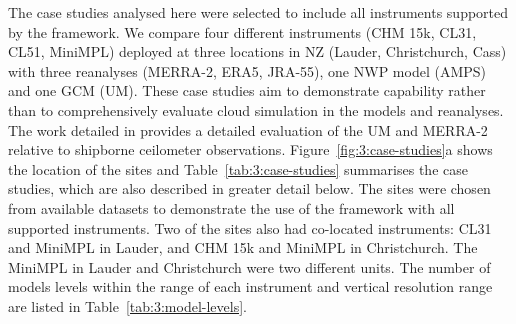 \begin{table}
\caption[Number of models levels and vertical resolution]{
Number of models levels and vertical resolution in the range of the
instrument at the locations of the case studies. First number is the number
of levels, followed by the minimum and maximum distance range between adjacent
model levels in the lidar's range (m).
}
\label{tab:3:model-levels}
\centerline{}
\end{table}

The case studies analysed here were selected
to include all instruments supported by the framework. We compare four different
instruments (CHM 15k, CL31, CL51, MiniMPL) deployed at three locations in NZ
(Lauder, Christchurch, Cass) with three reanalyses (MERRA-2, ERA5, JRA-55),
one NWP model (AMPS) and one GCM (UM).
These case studies aim to demonstrate capability rather than to comprehensively evaluate cloud simulation in the
models and reanalyses. The work detailed in \cite{kuma2020a} provides a detailed evaluation of the UM and MERRA-2 relative to shipborne ceilometer observations.
Figure~\ref{fig:3:case-studies}a shows the location of the sites and Table~\ref{tab:3:case-studies}
summarises the case studies, which are also described in greater detail below.
The sites were chosen from available datasets to demonstrate the use of the
framework with all supported instruments. Two of the sites also had co-located
instruments: CL31 and MiniMPL in Lauder, and CHM 15k and MiniMPL in
Christchurch. The MiniMPL in Lauder and Christchurch were two different units.
The number of models levels within the range of each instrument and vertical
resolution range are listed in Table~\ref{tab:3:model-levels}.

